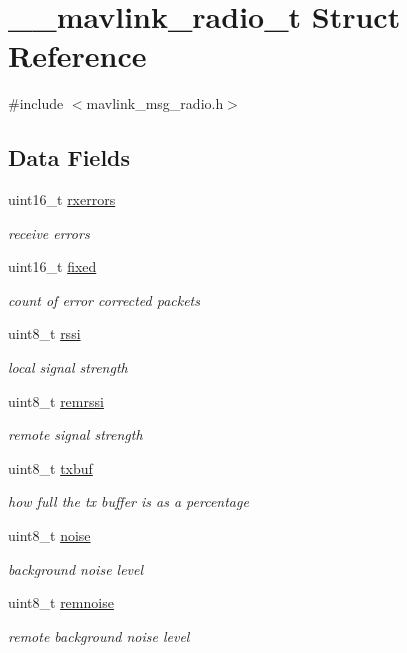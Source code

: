 \hypertarget{struct____mavlink__radio__t}{\section{\+\_\+\+\_\+mavlink\+\_\+radio\+\_\+t Struct Reference}
\label{struct____mavlink__radio__t}
}


{\ttfamily \#include $<$mavlink\+\_\+msg\+\_\+radio.\+h$>$}

\subsection*{Data Fields}
\begin{DoxyCompactItemize}
\item 
uint16\+\_\+t \hyperlink{struct____mavlink__radio__t_a458075d5fd12d04d7629af705a87ce9d}{rxerrors}
\begin{DoxyCompactList}\small\item\em receive errors \end{DoxyCompactList}\item 
uint16\+\_\+t \hyperlink{struct____mavlink__radio__t_a2352c5e14697c698e323b5bfaa1caeb0}{fixed}
\begin{DoxyCompactList}\small\item\em count of error corrected packets \end{DoxyCompactList}\item 
uint8\+\_\+t \hyperlink{struct____mavlink__radio__t_a037fac1d570dc799e3f7b9d60103357f}{rssi}
\begin{DoxyCompactList}\small\item\em local signal strength \end{DoxyCompactList}\item 
uint8\+\_\+t \hyperlink{struct____mavlink__radio__t_a686f687a4f88faaf0db6f2d553dcfc5a}{remrssi}
\begin{DoxyCompactList}\small\item\em remote signal strength \end{DoxyCompactList}\item 
uint8\+\_\+t \hyperlink{struct____mavlink__radio__t_a303caa23fe92a54cf62eedcc85bd3580}{txbuf}
\begin{DoxyCompactList}\small\item\em how full the tx buffer is as a percentage \end{DoxyCompactList}\item 
uint8\+\_\+t \hyperlink{struct____mavlink__radio__t_a08110d0faedb2a5f9fe7b92802abcec0}{noise}
\begin{DoxyCompactList}\small\item\em background noise level \end{DoxyCompactList}\item 
uint8\+\_\+t \hyperlink{struct____mavlink__radio__t_a25196996547b38eb6b20a507fceda210}{remnoise}
\begin{DoxyCompactList}\small\item\em remote background noise level \end{DoxyCompactList}\end{DoxyCompactItemize}


